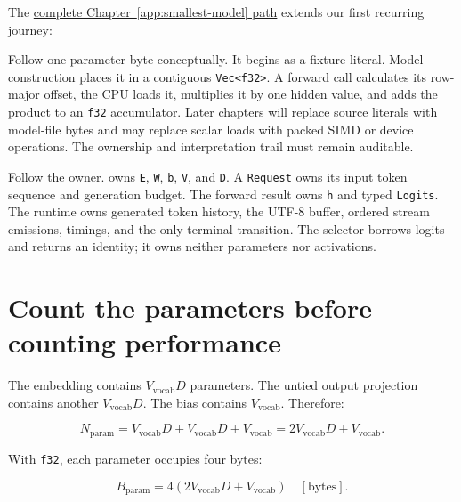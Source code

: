The
\href{https://github.com/hermonai/inside-the-llm-engine/blob/astra-visual-rewrite/diagrams/model/token-id-to-logits.txt}{complete
Chapter~\ref{app:smallest-model} path} extends our first recurring journey:


Follow one parameter byte conceptually. It begins as a fixture literal.
Model construction places it in a contiguous
\texttt{Vec\textless{}f32\textgreater{}}. A forward call calculates its
row-major offset, the CPU loads it, multiplies it by one hidden value,
and adds the product to an \texttt{f32} accumulator. Later chapters will
replace source literals with model-file bytes and may replace scalar
loads with packed SIMD or device operations. The ownership and
interpretation trail must remain auditable.

Follow the owner. \texttt{} owns \texttt{E},
\texttt{W}, \texttt{b}, \texttt{V}, and \texttt{D}. A \texttt{Request}
owns its input token sequence and generation budget. The forward result
owns \texttt{h} and typed \texttt{Logits}. The runtime owns generated
token history, the UTF-8 buffer, ordered stream emissions, timings, and
the only terminal transition. The selector borrows logits and returns an
identity; it owns neither parameters nor activations.

\section{Count the parameters before counting
performance}\label{count-the-parameters-before-counting-performance}

The embedding contains \(V_{\mathrm{vocab}}D\) parameters. The untied
output projection contains another \(V_{\mathrm{vocab}}D\). The bias
contains \(V_{\mathrm{vocab}}\). Therefore:

\begin{equation}
N_{\mathrm{param}}
=V_{\mathrm{vocab}}D+V_{\mathrm{vocab}}D+V_{\mathrm{vocab}}
=2V_{\mathrm{vocab}}D+V_{\mathrm{vocab}}.
\end{equation}

With \texttt{f32}, each parameter occupies four bytes:

\begin{equation}
B_{\mathrm{param}}
=4\left(2V_{\mathrm{vocab}}D+V_{\mathrm{vocab}}\right)
\quad[\mathrm{bytes}].
\end{equation}

